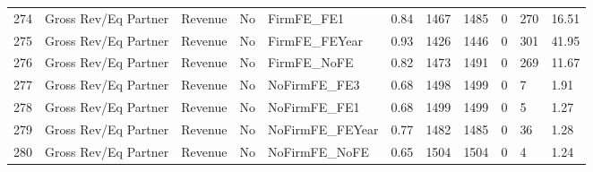 \begin{table}[ht]
\begin{tabular}{rllllllllll}
  274 & Gross Rev/Eq Partner & Revenue & No & FirmFE\_FE1 & 0.84 & 1467 & 1485 & 0 & 270 & 16.51 \\ 
  275 & Gross Rev/Eq Partner & Revenue & No & FirmFE\_FEYear & 0.93 & 1426 & 1446 & 0 & 301 & 41.95 \\ 
  276 & Gross Rev/Eq Partner & Revenue & No & FirmFE\_NoFE & 0.82 & 1473 & 1491 & 0 & 269 & 11.67 \\ 
  277 & Gross Rev/Eq Partner & Revenue & No & NoFirmFE\_FE3 & 0.68 & 1498 & 1499 & 0 & 7 & 1.91 \\ 
  278 & Gross Rev/Eq Partner & Revenue & No & NoFirmFE\_FE1 & 0.68 & 1499 & 1499 & 0 & 5 & 1.27 \\ 
  279 & Gross Rev/Eq Partner & Revenue & No & NoFirmFE\_FEYear & 0.77 & 1482 & 1485 & 0 & 36 & 1.28 \\ 
  280 & Gross Rev/Eq Partner & Revenue & No & NoFirmFE\_NoFE & 0.65 & 1504 & 1504 & 0 & 4 & 1.24 \\ 
   \hline
\end{tabular}
\end{table}
